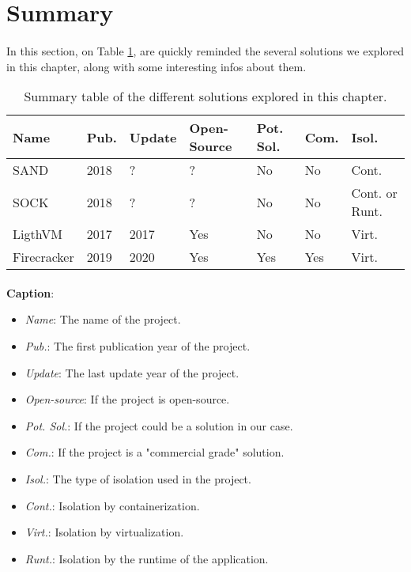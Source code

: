 \section{Summary}
\paragraph{}In this section, on Table \ref{tab:summary}, are quickly reminded the several solutions we explored in this chapter, along with some interesting infos about them.
\begin{table}[!h]

  \begin{center}
    \begin{tabular}{|p{}|p{}|p{}|p{}|p{}|p{}|p{}|}
       \hline
       \textbf{Name} & \textbf{Pub.} & \textbf{Update} & \textbf{Open-Source} & \textbf{Pot. Sol.} & \textbf{Com.} & \textbf{Isol.} \\
       \hline
       SAND & 2018 & ? & ? & No & No & Cont. \\
       \hline
       SOCK & 2018 & ? & ? & No & No & Cont. or Runt. \\
       \hline
       LigthVM & 2017 & 2017 & Yes & No & No & Virt. \\
       \hline
       Firecracker & 2019 & 2020 & Yes & Yes & Yes & Virt.\\
       \hline
    \end{tabular}
  \end{center}
  \caption{Summary table of the different solutions explored in this chapter.}
  \label{tab:summary}
\end{table}
\paragraph{}\textbf{Caption}: 
\begin{itemize}
\renewcommand\labelitemi{--}
  \item \textit{Name}: The name of the project.
  \item \textit{Pub.}: The first publication year of the project.
  \item \textit{Update}: The last update year of the project.
  \item \textit{Open-source}: If the project is open-source.
  \item \textit{Pot. Sol.}: If the project could be a solution in our case.
  \item \textit{Com.}: If the project is a "commercial grade" solution.
  \item \textit{Isol.}: The type of isolation used in the project.
  \item \textit{Cont.}: Isolation by containerization.
  \item \textit{Virt.}: Isolation by virtualization.
  \item \textit{Runt.}: Isolation by the runtime of the application.
\end{itemize}

